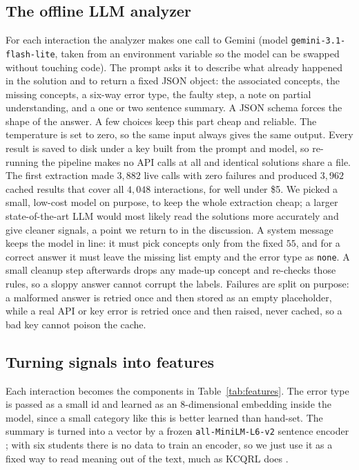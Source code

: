 \documentclass[11pt]{article}
\newcommand{\code}[1]{\texttt{\small #1}}
\begin{document}
\subsection{The offline LLM analyzer}
For each interaction the analyzer makes one call to Gemini (model
\code{gemini-3.1-flash-lite}, taken from an environment variable so the model can be
swapped without touching code). The prompt asks it to describe what already happened
in the solution and to return a fixed JSON object: the associated concepts, the
missing concepts, a six-way error type, the faulty step, a note on partial
understanding, and a one or two sentence summary. A JSON schema forces the shape of
the answer. A few choices keep this part cheap and reliable. The temperature is set to
zero, so the same input always gives the same output. Every result is saved to disk
under a key built from the prompt and model, so re-running the pipeline makes no API
calls at all and identical solutions share a file. The first extraction made
$3{,}882$ live calls with zero failures and produced $3{,}962$ cached results that
cover all $4{,}048$ interactions, for well under \$5. We picked a small, low-cost model
on purpose, to keep the whole extraction cheap; a larger state-of-the-art LLM would most
likely read the solutions more accurately and give cleaner signals, a point we return to
in the discussion. A system message keeps the model
in line: it must pick concepts only from the fixed $55$, and for a correct answer it
must leave the missing list empty and the error type as \code{none}. A small
cleanup step afterwards drops any made-up concept and re-checks those rules, so a
sloppy answer cannot corrupt the labels. Failures are split on purpose: a malformed
answer is retried once and then stored as an empty placeholder, while a real API or
key error is retried once and then raised, never cached, so a bad key cannot poison the
cache.

\subsection{Turning signals into features}
Each interaction becomes the components in Table~\ref{tab:features}. The error type is
passed as a small id and learned as an $8$-dimensional embedding inside the model,
since a small category like this is better learned than hand-set. The summary is
turned into a vector by a frozen \code{all-MiniLM-L6-v2} sentence encoder
\cite{reimers2019sbert}; with six students there is no data to train an encoder, so we
just use it as a fixed way to read meaning out of the text, much as KCQRL does
\cite{ozyurt2024kcqrl}.
\end{document}
